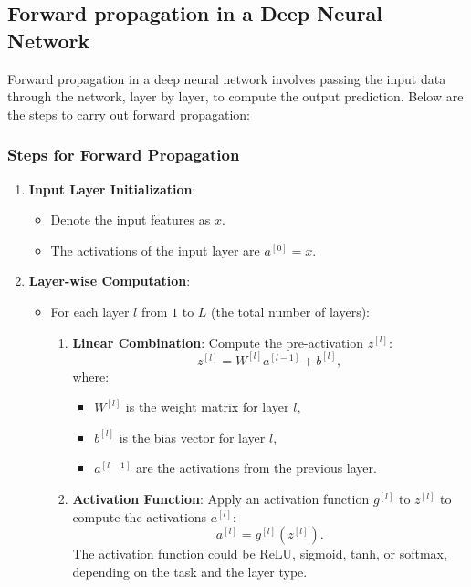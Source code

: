 \documentclass[letterpaper,12pt,notitlepage,twoside]{report}
\begin{document}
\subsection{Forward propagation in a Deep Neural Network}
Forward propagation in a deep neural network involves passing the input data through the network, layer by layer, to compute the output prediction. Below are the steps to carry out forward propagation:

\subsubsection*{Steps for Forward Propagation}

\begin{enumerate}
    \item \textbf{Input Layer Initialization}:
    \begin{itemize}
        \item Denote the input features as \( x \).
        \item The activations of the input layer are \( a^{[0]} = x \).
    \end{itemize}

    \item \textbf{Layer-wise Computation}: 
	\begin{itemize}
		\item For each layer \( l \) from \( 1 \) to \( L \) (the total number of layers):
		\begin{enumerate}
	        \item \textbf{Linear Combination}: Compute the pre-activation \( z^{[l]} \):
	        \[
	        z^{[l]} = W^{[l]} a^{[l-1]} + b^{[l]},
	        \]
	        where:
	        \begin{itemize}
	            \item \( W^{[l]} \) is the weight matrix for layer \( l \),
	            \item \( b^{[l]} \) is the bias vector for layer \( l \),
	            \item \( a^{[l-1]} \) are the activations from the previous layer.
	        \end{itemize}
	
	        \item \textbf{Activation Function}: Apply an activation function \( g^{[l]} \) to \( z^{[l]} \) to compute the activations \( a^{[l]} \):
	        \[
	        a^{[l]} = g^{[l]}(z^{[l]}).
	        \]
	        The activation function could be ReLU, sigmoid, tanh, or softmax, depending on the task and the layer type.
	   	 \end{enumerate}
	\end{itemize}
    

\end{enumerate}
\end{document}
